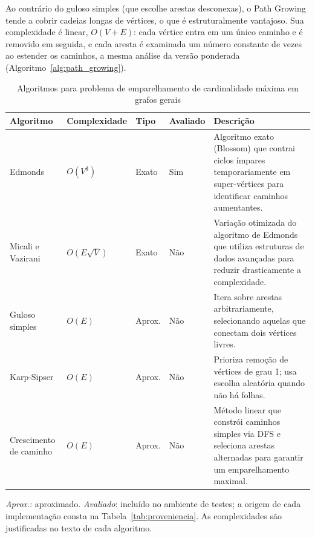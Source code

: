 Ao contrário do guloso simples (que escolhe arestas desconexas), o Path Growing tende a cobrir cadeias longas de vértices, o que é estruturalmente vantajoso. Sua complexidade é linear, $O(V + E)$: cada vértice entra em um único caminho e é removido em seguida, e cada aresta é examinada um número constante de vezes ao estender os caminhos, a mesma análise da versão ponderada (Algoritmo~\ref{alg:path_growing}).

\begin{table}[H]
    \centering
    \caption{Algoritmos para problema de emparelhamento de cardinalidade máxima em grafos gerais}
    \label{tab:emp_card_max_geral_algos}
    \renewcommand{\arraystretch}{1.2} %
    \footnotesize
    
    \begin{tabularx}{\textwidth}{@{} >{\raggedright\arraybackslash}p{2.8cm} l l l >{\raggedright\arraybackslash}X @{}}
        \toprule
        \textbf{Algoritmo} & \textbf{Complexidade} & \textbf{Tipo} & \textbf{Avaliado} & \textbf{Descrição} \\
        \midrule
        
        Edmonds & $O(V^3)$ & Exato & Sim & 
        Algoritmo exato (Blossom) que contrai ciclos ímpares temporariamente em super-vértices para identificar caminhos aumentantes. \\
        \addlinespace 

        Micali e Vazirani & $O(E\sqrt{V})$ & Exato & Não & 
        Variação otimizada do algoritmo de Edmonds que utiliza estruturas de dados avançadas para reduzir drasticamente a complexidade. \\
        \addlinespace 

        Guloso simples & $O(E)$ & Aprox. & Não & 
        Itera sobre arestas arbitrariamente, selecionando aquelas que conectam dois vértices livres. \\
        \addlinespace

        Karp-Sipser & $O(E)$ & Aprox. & Não & 
        Prioriza remoção de vértices de grau 1; usa escolha aleatória quando não há folhas. \\
        \addlinespace
        
        Crescimento de caminho & $O(E)$ & Aprox. & Não & 
        Método linear que constrói caminhos simples via DFS e seleciona arestas alternadas para garantir um emparelhamento maximal. \\
        
        \bottomrule
    \end{tabularx}
    \par\smallskip
    {\raggedright\footnotesize \textit{Aprox.}: aproximado. \textit{Avaliado}: incluído no ambiente de testes; a origem de cada implementação consta na Tabela~\ref{tab:proveniencia}. As complexidades são justificadas no texto de cada algoritmo.\par}
\end{table}
